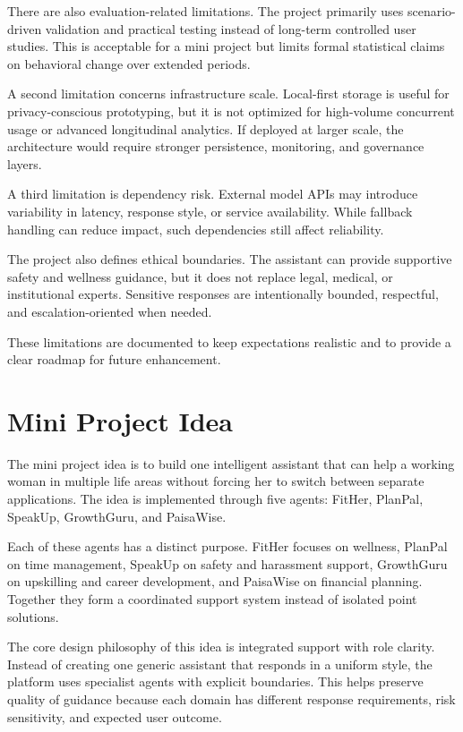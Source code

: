 \documentclass[oneside,a4paper,12pt]{report}
\begin{document}
There are also evaluation-related limitations. The project primarily uses scenario-driven validation and practical testing instead of long-term controlled user studies. This is acceptable for a mini project but limits formal statistical claims on behavioral change over extended periods.

A second limitation concerns infrastructure scale. Local-first storage is useful for privacy-conscious prototyping, but it is not optimized for high-volume concurrent usage or advanced longitudinal analytics. If deployed at larger scale, the architecture would require stronger persistence, monitoring, and governance layers.

A third limitation is dependency risk. External model APIs may introduce variability in latency, response style, or service availability. While fallback handling can reduce impact, such dependencies still affect reliability.

The project also defines ethical boundaries. The assistant can provide supportive safety and wellness guidance, but it does not replace legal, medical, or institutional experts. Sensitive responses are intentionally bounded, respectful, and escalation-oriented when needed.

These limitations are documented to keep expectations realistic and to provide a clear roadmap for future enhancement.

\section{Mini Project Idea}
The mini project idea is to build one intelligent assistant that can help a working woman in multiple life areas without forcing her to switch between separate applications. The idea is implemented through five agents: FitHer, PlanPal, SpeakUp, GrowthGuru, and PaisaWise.

Each of these agents has a distinct purpose. FitHer focuses on wellness, PlanPal on time management, SpeakUp on safety and harassment support, GrowthGuru on upskilling and career development, and PaisaWise on financial planning. Together they form a coordinated support system instead of isolated point solutions.

The core design philosophy of this idea is integrated support with role clarity. Instead of creating one generic assistant that responds in a uniform style, the platform uses specialist agents with explicit boundaries. This helps preserve quality of guidance because each domain has different response requirements, risk sensitivity, and expected user outcome.
\end{document}
